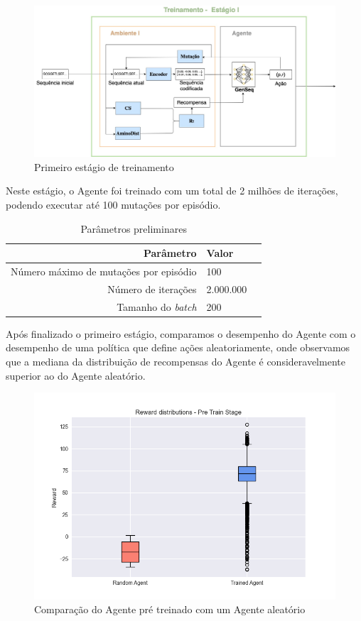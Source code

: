 \begin{figure}[H]
  \centering
  \includegraphics[width=.8\textwidth]{figuras/metodologia-Pre-Training.jpg}
  \caption{Primeiro estágio de treinamento}
\end{figure}

Neste estágio, o Agente foi treinado com um total de 2 milhões de iterações, podendo executar até 100 mutações por episódio.
\begin{table}[H]
  \centering
  \vspace{0.5cm}
  \begin{tabular}{r|lr}
  Parâmetro & Valor \\ 
  \hline                               %
  Número máximo de mutações por episódio & 100 \\
  Número de iterações & 2.000.000 \\
  Tamanho do \textit{batch} & 200 \\
  \end{tabular}
  \caption{Parâmetros preliminares}
  \end{table}

  Após finalizado o primeiro estágio, comparamos o desempenho do Agente com o desempenho de uma política que define ações aleatoriamente, onde observamos
  que a mediana da distribuição de recompensas do Agente é consideravelmente superior ao do Agente aleatório. 

  \begin{figure}[H]
    \centering
    \includegraphics[width=.8\linewidth]{figuras/plot_box_pre_train_reward.jpg}  
    \caption{Comparação do Agente pré treinado com um Agente aleatório}
    \label{fig:box-pre-train}
  \end{figure}

